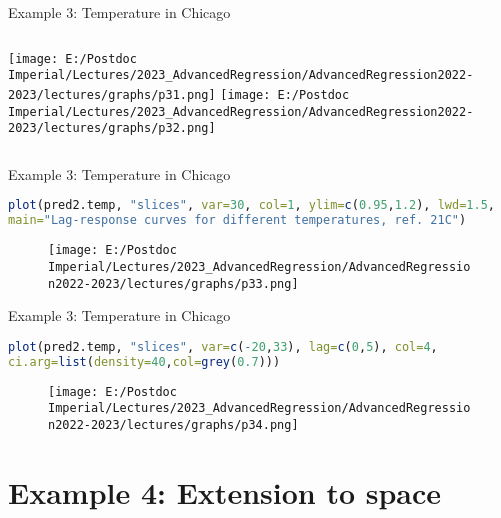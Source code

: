 \documentclass{beamer}
\begin{document}
\begin{frame}{Example 3: Temperature in Chicago}
\begin{columns}
	\texttt{[image: E:/Postdoc Imperial/Lectures/2023\_AdvancedRegression/AdvancedRegression2022-2023/lectures/graphs/p31.png]}
	\texttt{[image: E:/Postdoc Imperial/Lectures/2023\_AdvancedRegression/AdvancedRegression2022-2023/lectures/graphs/p32.png]}
\end{columns}
\end{frame}



\begin{frame}[fragile]{Example 3: Temperature in Chicago}
		\begin{lstlisting}[language=R, basicstyle=\tiny]
plot(pred2.temp, "slices", var=30, col=1, ylim=c(0.95,1.2), lwd=1.5,
main="Lag-response curves for different temperatures, ref. 21C")
	\end{lstlisting}
		\begin{figure}
		\texttt{[image: E:/Postdoc Imperial/Lectures/2023\_AdvancedRegression/AdvancedRegression2022-2023/lectures/graphs/p33.png]}	
	\end{figure}
\end{frame}

\begin{frame}[fragile]{Example 3: Temperature in Chicago}
\begin{lstlisting}[language=R, basicstyle=\tiny]
plot(pred2.temp, "slices", var=c(-20,33), lag=c(0,5), col=4,
ci.arg=list(density=40,col=grey(0.7)))
\end{lstlisting}	
		\begin{figure}
	\texttt{[image: E:/Postdoc Imperial/Lectures/2023\_AdvancedRegression/AdvancedRegression2022-2023/lectures/graphs/p34.png]}	
\end{figure}
\end{frame}

\section{Example 4: Extension to space}
\end{document}
